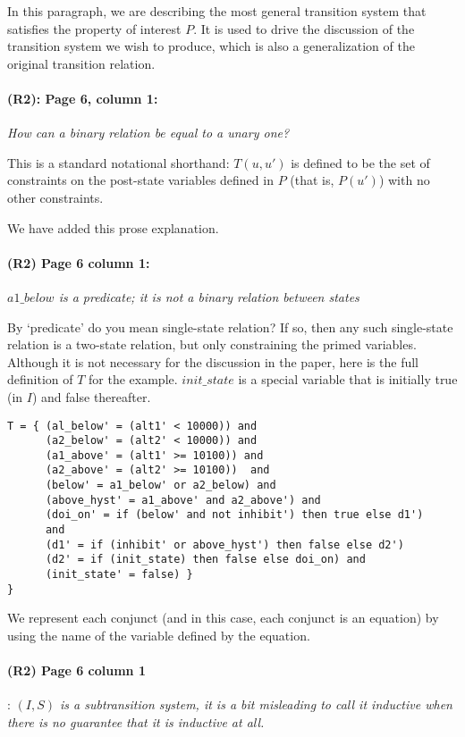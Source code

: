 \documentclass{article}
\begin{document}
\noindent In this paragraph, we are describing the most general transition system that satisfies the property of interest $P$.  It is used to drive the discussion of the transition system we wish to produce, which is also a generalization of the original transition relation.

\paragraph{(R2): Page 6, column 1:} \textit{How can a binary relation be equal to a unary
one?}
\vspace{0.05in}

\noindent This is a standard notational shorthand: $T(u, u')$ is defined to be the set of constraints on the post-state variables defined in $P$ (that
is, $P(u')$) with no other constraints.

We have added this prose explanation.

\paragraph{(R2) Page 6 column 1:} \textit{$a1\_below$ is a predicate; it is not a binary
relation between states}
\vspace{0.05in}

\noindent By `predicate' do you mean single-state relation? If so, then
any such single-state relation is a two-state relation, but only constraining the primed variables.  Although it is not necessary for the discussion in the paper, here is the
full definition of $T$ for the example. $init\_state$ is a special
variable that is initially true (in $I$) and false thereafter.

\begin{verbatim}
T = { (al_below' = (alt1' < 10000)) and
      (a2_below' = (alt2' < 10000)) and
      (a1_above' = (alt1' >= 10100)) and
      (a2_above' = (alt2' >= 10100))  and
      (below' = a1_below' or a2_below) and
      (above_hyst' = a1_above' and a2_above') and
      (doi_on' = if (below' and not inhibit') then true else d1')
      and
      (d1' = if (inhibit' or above_hyst') then false else d2')
      (d2' = if (init_state) then false else doi_on) and
      (init_state' = false) }
}
\end{verbatim}

We represent each conjunct (and in this case, each conjunct is an equation) by using the name of the variable defined by the equation.

\paragraph{(R2) Page 6 column 1}: \textit{$(I, S)$ is a subtransition system, it is a bit
misleading to call it inductive when there is no guarantee that it
is inductive at all.}
\vspace{0.05in}
\end{document}
